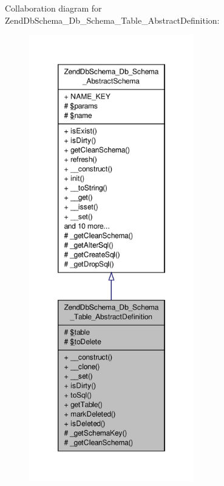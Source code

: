 Collaboration diagram for Zend\-Db\-Schema\-\_\-\-Db\-\_\-\-Schema\-\_\-\-Table\-\_\-\-Abstract\-Definition\-:\nopagebreak
\begin{figure}[H]
\begin{center}
\leavevmode
\includegraphics[height=550pt]{classZendDbSchema__Db__Schema__Table__AbstractDefinition__coll__graph}
\end{center}
\end{figure}
